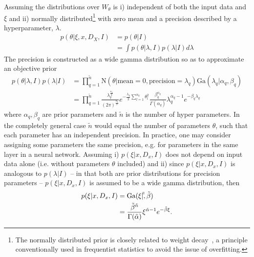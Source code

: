 Assuming the distributions over $W_\theta$ is i) independent of both the input data and $\xi$ and ii) normally distributed\footnote{The normally distributed prior is closely related to weight decay~\citep{Plaut1986}, a principle conventionally used in frequentist statistics to avoid the issue of overfitting.} with zero mean and a precision described by a hyperparameter, $\lambda$. 	 
\begin{equation}
	\begin{split}
		p(\theta|\xi,x,D_X,I) & = p(\theta|I)\\
		& = \int p(\theta|\lambda,I)p(\lambda|I)d\lambda
	\end{split}
	\label{eq:prior1}
\end{equation}
The precision is constructed as a wide gamma distribution so as to approximate an objective prior
\begin{equation}
	\begin{split}
		p(\theta|\lambda,I)p(\lambda|I) &=\prod_{q=1}^{\tilde{n}}\text{N}(\theta|\text{mean} = 0, \text{precision} = \lambda_q)\text{Ga}(\lambda_q|\alpha_q,\beta_q)\\
		&= \prod_{q=1}^{\tilde{n}} \frac{\lambda_q^\frac{n_q}{2}}{(2\pi)^\frac{n_q}{2}}e^{-\frac{\lambda_q}{2}\sum_{l=1}^{n_q}\theta_l^2}\frac{\beta_q^{\alpha_q}}{\Gamma(\alpha_q)}\lambda_q^{\alpha_q-1}e^{-\beta_q \lambda_q}
	\end{split}
	\label{eq:prior}
\end{equation}
where $\alpha_q,\beta_q$ are prior parameters and $\tilde{n}$ is the number of hyper parameters. In the completely general case $\tilde{n}$ would equal the number of parameters $\theta$, such that each parameter has an independent precision. In practice, one may consider assigning some parameters the same precision, e.g. for parameters in the same layer in a neural network. Assuming i) $p(\xi|x,D_x,I)$ does not depend on input data alone (i.e. without parameters $\theta$ included) and ii) since $p(\xi|x,D_x,I)$ is analogous to $p(\lambda|I)$ -- in that both are prior distributions for precision parameters -- $p(\xi|x,D_x,I)$ is assumed to be a wide gamma distribution, then
\begin{equation}
	\begin{split}
		p(\xi|x,D_x,I) & = \text{Ga}(\xi|\tilde{\tilde},\tilde{\beta})\\
		& =\frac{\tilde{\beta}^{\tilde{\alpha}}}{\Gamma(\tilde{\alpha})}\xi^{\tilde{\alpha}-1}e^{-\tilde{\beta} \xi}.
	\end{split}
	\label{p7}
\end{equation}
